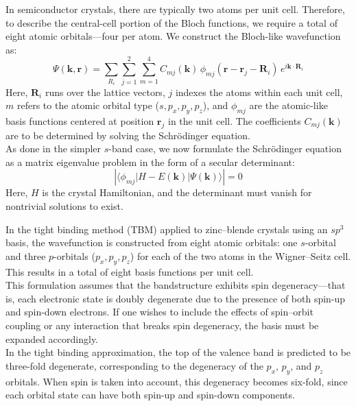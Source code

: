 In semiconductor crystals, there are typically two atoms per unit cell. Therefore, to describe the central-cell portion of the Bloch functions, we require a total of eight atomic orbitals—four per atom. We construct the Bloch-like wavefunction as:
\begin{equation}
	\Psi(\mathbf{k}, \mathbf{r}) = \sum_{R_i} \sum_{j=1}^{2} \sum_{m=1}^{4} C_{mj}(\mathbf{k}) \, \phi_{mj}(\mathbf{r} - \mathbf{r}_j - \mathbf{R}_i) \, e^{i\mathbf{k} \cdot \mathbf{R}_i}
\end{equation}
\noindent
Here, \( \mathbf{R}_i \) runs over the lattice vectors, \( j \) indexes the atoms within each unit cell, \( m \) refers to the atomic orbital type (\( s, p_x, p_y, p_z \)), and \( \phi_{mj} \) are the atomic-like basis functions centered at position \( \mathbf{r}_j \) in the unit cell. The coefficients \( C_{mj}(\mathbf{k}) \) are to be determined by solving the Schrödinger equation.\\
As done in the simpler \( s \)-band case, we now formulate the Schrödinger equation as a matrix eigenvalue problem in the form of a secular determinant:
\begin{equation}
	\left| \langle \phi_{mj} | H - E(\mathbf{k}) | \Psi(\mathbf{k}) \rangle \right| = 0
\end{equation}
\noindent
Here, \( H \) is the crystal Hamiltonian, and the determinant must vanish for nontrivial solutions to exist.

In the tight binding method (TBM) applied to zinc–blende crystals using an \( sp^3 \) basis, the wavefunction is constructed from eight atomic orbitals: one \( s \)-orbital and three \( p \)-orbitals (\( p_x, p_y, p_z \)) for each of the two atoms in the Wigner–Seitz cell. This results in a total of eight basis functions per unit cell.\\

This formulation assumes that the bandstructure exhibits spin degeneracy—that is, each electronic state is doubly degenerate due to the presence of both spin-up and spin-down electrons. If one wishes to include the effects of spin–orbit coupling or any interaction that breaks spin degeneracy, the basis must be expanded accordingly.\\

In the tight binding approximation, the top of the valence band is predicted to be three-fold degenerate, corresponding to the degeneracy of the \( p_x \), \( p_y \), and \( p_z \) orbitals. When spin is taken into account, this degeneracy becomes six-fold, since each orbital state can have both spin-up and spin-down components.\\

